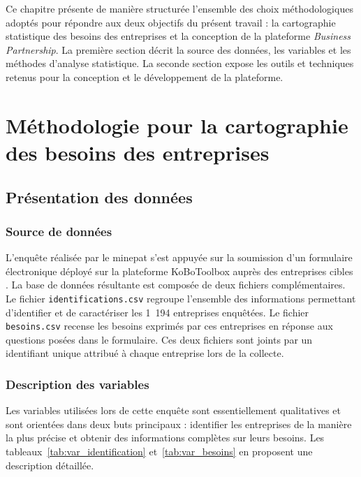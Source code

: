 \documentclass[12pt, a4paper, oneside]{report}
\begin{document}
Ce chapitre présente de manière structurée l'ensemble des choix méthodologiques adoptés pour répondre aux deux objectifs du présent travail : la cartographie statistique des besoins des entreprises et la conception de la plateforme \textit{Business Partnership}. La première section décrit la source des données, les variables et les méthodes d'analyse statistique. La seconde section expose les outils et techniques retenus pour la conception et le développement de la plateforme.

\section{Méthodologie pour la cartographie des besoins des entreprises}

\subsection{Présentation des données}

\subsubsection{Source de données}

L'enquête réalisée par le \gls{minepat} s'est appuyée sur la soumission d'un formulaire électronique déployé sur la plateforme KoBoToolbox auprès des entreprises cibles \cite{kobotoolbox}. La base de données résultante est composée de deux fichiers complémentaires. Le fichier \texttt{identifications.csv} regroupe l'ensemble des informations permettant d'identifier et de caractériser les 1~194 entreprises enquêtées. Le fichier \texttt{besoins.csv} recense les besoins exprimés par ces entreprises en réponse aux questions posées dans le formulaire. Ces deux fichiers sont joints par un identifiant unique attribué à chaque entreprise lors de la collecte.

\subsubsection{Description des variables}

Les variables utilisées lors de cette enquête sont essentiellement qualitatives et sont orientées dans deux buts principaux : identifier les entreprises de la manière la plus précise et obtenir des informations complètes sur leurs besoins. Les tableaux~\ref{tab:var_identification} et~\ref{tab:var_besoins} en proposent une description détaillée.
\end{document}
